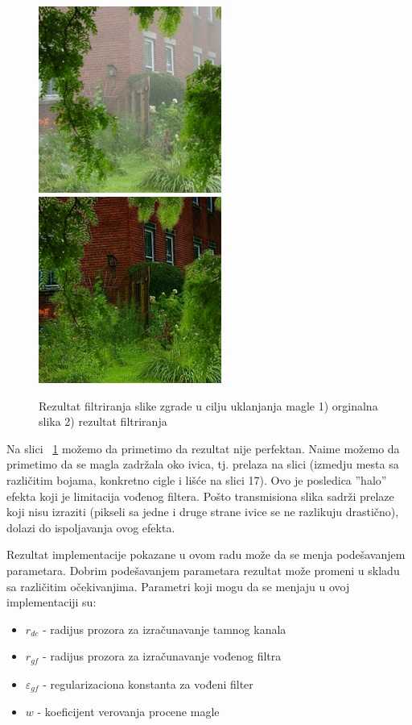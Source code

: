 \documentclass[a4paper,12pt,titlepage]{article}
\begin{document}
\begin{figure}[ht!]
\centering
\includegraphics[width=60mm]{img/haze.png}
\includegraphics[width=60mm]{img/hazeRes.png}
\caption{Rezultat filtriranja slike zgrade u cilju uklanjanja magle 1) orginalna slika 2) rezultat filtriranja}
\label{dehaze}
\end{figure}   

Na slici ~\ref{dehaze} možemo da primetimo da rezultat nije perfektan. Naime možemo da primetimo da se magla zadržala oko ivica, tj. prelaza na slici (izmedju mesta sa različitim bojama, konkretno cigle i lišće na slici 17). Ovo je posledica ''halo'' efekta koji je limitacija vođenog filtera. Pošto transmisiona slika sadrži prelaze koji nisu izraziti (pikseli sa jedne i druge strane ivice se ne razlikuju drastično), dolazi do ispoljavanja ovog efekta.

Rezultat implementacije pokazane u ovom radu može da se menja podešavanjem parametara. Dobrim podešavanjem parametara rezultat može promeni u skladu sa različitim očekivanjima. Parametri koji mogu da se menjaju u ovoj implementaciji su:

\newpage
\begin{itemize}
\item $r_{dc}$ - radijus prozora za izračunavanje tamnog kanala 
\item $r_{gf}$ - radijus prozora za izračunavanje vođenog filtra
\item $\varepsilon_{gf}$ - regularizaciona konstanta za vođeni filter 
\item $w$ - koeficijent verovanja procene magle
\end{itemize}
\end{document}
